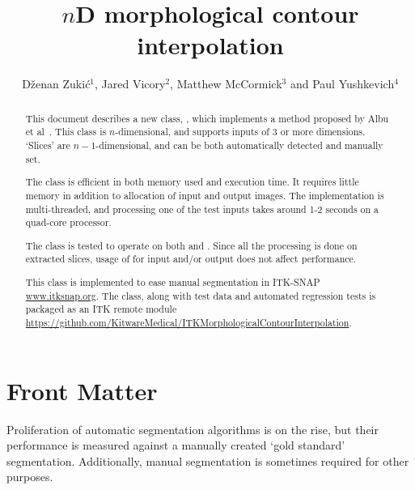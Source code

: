 \documentclass{InsightArticle}
\title{$n$D morphological contour interpolation}
\author{D{\v z}enan Zuki{\' c}$^{1}$, Jared Vicory$^{2}$, Matthew McCormick$^{3}$ and Paul Yushkevich$^{4}$}
\newcommand{\IJhandlerIDnumber}{1338}
\begin{document}
\IJhandlefooter{\IJhandlerIDnumber}

\ifpdf
\else
\fi

\maketitle

\ifhtml
\chapter*{Front Matter\label{front}}
\fi


\begin{abstract}
\noindent
This document describes a new class, ,
which implements a method proposed by Albu et al~\cite{Albu2008}.
This class is $n$-dimensional, and supports inputs of 3 or more dimensions.
`Slices' are $n-1$-dimensional, and can be both automatically detected and manually set.

The class is efficient in both memory used and execution time.
It requires little memory in addition to allocation of input and output images.
The implementation is multi-threaded, and processing one of the test inputs
takes around 1-2 seconds on a quad-core processor.

The class is tested to operate on both  and .
Since all the processing is done on extracted slices,
usage of  for input and/or output does not affect performance.

This class is implemented to ease manual segmentation in ITK-SNAP \url{www.itksnap.org}.
The class, along with test data and automated regression tests is packaged as an ITK
remote module \url{https://github.com/KitwareMedical/ITKMorphologicalContourInterpolation}.
\end{abstract}

\IJhandlenote{\IJhandlerIDnumber}

\tableofcontents


Proliferation of automatic segmentation algorithms is on the rise,
but their performance is measured against a manually created `gold standard' segmentation.
Additionally, manual segmentation is sometimes required for other purposes.
\end{document}
